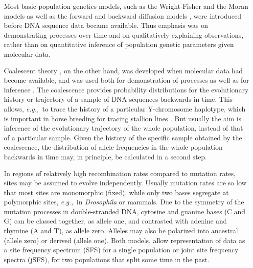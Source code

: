 \documentclass[preprint]{elsarticle}
\newcommand\eg{{\it e.g.,}}
\begin{document}
Most basic population genetics models, such as the Wright-Fisher and the Moran models as well as the forward and backward diffusion models \citep[reviewed in][]{Ewen04}, were introduced before DNA sequence data became available. Thus emphasis was on demonstrating processes over time and on qualitatively explaining observations, rather than on quantitative inference of population genetic parameters given molecular data.

Coalescent theory \citep{King82}, on the other hand, was developed when molecular data had become available, and was used both for demonstration of processes as well as for inference \citep{Hein05,Wake09}. The coalescence provides probability distributions for the evolutionary history or trajectory of a sample of DNA sequences backwards in time. This allows, \eg\ to trace the history of a particular Y-chromosome haplotype, which is important in horse breeding for tracing stallion lines \citep{Wall13}. But usually the aim is inference of the evolutionary trajectory of the whole population, instead of that of a particular sample. Given the history of the specific sample obtained by the coalescence, the distribution of allele frequencies in the whole population backwards in time may, in principle, be calculated in a second step. 

In regions of relatively high recombination rates compared to mutation rates, sites may be assumed to evolve independently. Usually mutation rates are so low that most sites are monomorphic (fixed), while only two bases segregate at polymorphic sites, \eg\ in \textit{Drosophila} or mammals. Due to the symmetry of the mutation processes in double-stranded DNA, cytosine and guanine bases (C and G) can be classed together, as allele one, and contrasted with adenine and thymine (A and T), as allele zero. Alleles may also be polarized into ancestral (allele zero) or derived (allele one). Both models, allow representation of data as a site frequency spectrum (SFS) for a single population or joint site frequency spectra (jSFS), for two populations that split some time in the past. 
\end{document}

